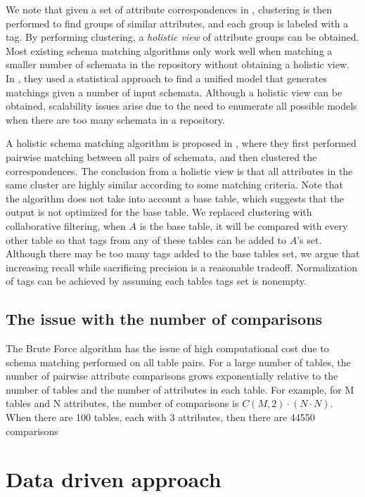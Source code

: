 We note that given a set of attribute correspondences in \cite{Smith2011Unity}, clustering is then performed to find groups of similar attributes, and each group is labeled with a tag. By performing clustering, a \textit{holistic view} of attribute groups can be obtained. Most existing schema matching algorithms only work well when matching a smaller number of schemata in the repository without obtaining a holistic view. In \cite{10.1145/2396761.2398468}, they used a statistical approach to find a unified model that generates matchings given a number of input schemata. Although a holistic view can be obtained, scalability issues arise due to the need to enumerate all possible models when there are too many schemata in a repository.

A holistic schema matching algorithm is proposed in \cite{Rahm2016Case}, where they first performed pairwise matching between all pairs of schemata, and then clustered the correspondences. The conclusion from a holistic view is that all attributes in the same cluster are highly similar according to some matching criteria. Note that the algorithm does not take into account a base table, which suggests that the output is not optimized for the base table. We replaced clustering with collaborative filtering, when $A$ is the base table, it will be compared with every other table so that tags from any of these tables can be added to $A$'s set. Although there may be too many tags added to the base tables set, we argue that increasing recall while sacrificing precision is a reasonable tradeoff. Normalization of tags can be achieved by assuming each tables tags set is nonempty.

\subsection{The issue with the number of comparisons}

The Brute Force algorithm has the issue of high computational cost due to schema matching performed on all table pairs. For a large number of tables, the number of pairwise attribute comparisons grows exponentially relative to the number of tables and the number of attributes in each table. For example, for M tables and N attributes, the number of comparisons is $C(M,2)\cdot(N\cdot N)$. When there are 100 tables, each with 3 attributes, then there are 44550 comparisons

\section{Data driven approach}
\label{sec:DataDrivenApproach}

